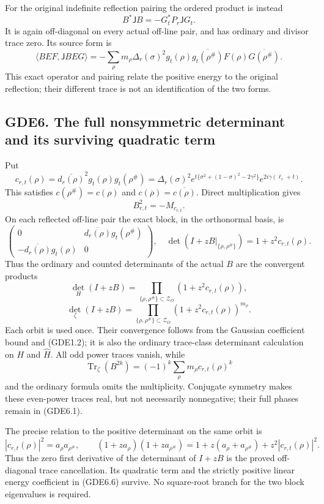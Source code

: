 For the original indefinite reflection pairing the ordered product is
instead \[
B^*\mathsf JB=-G_t^*P_r\mathsf JG_t.
\tag{GDE5.5}
\] It is again off-diagonal on every actual off-line pair, and has
ordinary and divisor trace zero. Its source form is \[
\langle BEF,\mathsf JBEG\rangle
=-\sum_\rho m_\rho\Delta_r(\sigma)^2
g_t(\rho)\overline{g_t(\rho^\#)}
F(\rho)\overline{G(\rho^\#)}.
\tag{GDE5.6}
\] This exact operator and pairing relate the positive energy to the
original reflection; their different trace is not an identification of
the two forms.

\subsection{GDE6. The full nonsymmetric determinant and its surviving
quadratic
term}\label{gde6.-the-full-nonsymmetric-determinant-and-its-surviving-quadratic-term}

Put \[
c_{r,t}(\rho)=\overline{d_r(\rho)}^{2}g_t(\rho)g_t(\rho^\#)
=\Delta_r(\sigma)^2
e^{t\{\sigma^2+(1-\sigma)^2-2\gamma^2\}}
e^{2i\gamma(\ell_r+t)}.
\tag{GDE6.1}
\] This satisfies \(c(\rho^\#)=c(\rho)\) and
\(c(\overline\rho)=\overline{c(\rho)}\). Direct multiplication gives \[
B_{r,t}^{2}=-M_{c_{r,t}}.
\tag{GDE6.2}
\] On each reflected off-line pair the exact block, in the orthonormal
basis, is \[
\begin{pmatrix}
0&\overline{d_r(\rho)}g_t(\rho^\#)\\
-\overline{d_r(\rho)}g_t(\rho)&0
\end{pmatrix},
\quad
\det(I+zB|_{\{\rho,\rho^\#\}})=1+z^2c_{r,t}(\rho).
\tag{GDE6.3}
\] Thus the ordinary and counted determinants of the actual \(B\) are
the convergent products \[
\det_H(I+zB)=\prod_{\{\rho,\rho^\#\}\subset\mathscr Z_O}
(1+z^2c_{r,t}(\rho)),
\] \[
\det_{\zeta}(I+zB)=\prod_{\{\rho,\rho^\#\}\subset\mathscr Z_O}
(1+z^2c_{r,t}(\rho))^{m_\rho}.
\tag{GDE6.4}
\] Each orbit is used once. Their convergence follows from the Gaussian
coefficient bound and (GDE1.2); it is also the ordinary trace-class
determinant calculation on \(H\) and \(\widehat H\). All odd power
traces vanish, while \[
\operatorname{Tr}_{\zeta}(B^{2k})
=(-1)^k\sum_\rho m_\rho c_{r,t}(\rho)^k
\tag{GDE6.5}
\] and the ordinary formula omits the multiplicity. Conjugate symmetry
makes these even-power traces real, but not necessarily nonnegative;
their full phases remain in (GDE6.1).

The precise relation to the positive determinant on the same orbit is \[
|c_{r,t}(\rho)|^2=a_\rho a_{\rho^\#},
\qquad
(1+za_\rho)(1+za_{\rho^\#})
=1+z(a_\rho+a_{\rho^\#})+z^2|c_{r,t}(\rho)|^2.
\tag{GDE6.6}
\] Thus the zero first derivative of the determinant of \(I+zB\) is the
proved off-diagonal trace cancellation. Its quadratic term and the
strictly positive linear energy coefficient in (GDE6.6) survive. No
square-root branch for the two block eigenvalues is required.


